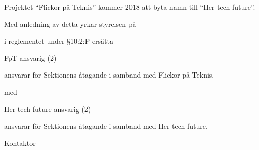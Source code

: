 \documentclass[../_main/handlingar.tex]{subfiles}
\begin{document}
Projektet ``Flickor på Teknis'' kommer 2018 att byta namn till ``Her tech future''.

Med anledning av detta yrkar styrelsen på
\begin{attsatser}
    \att i reglementet under \S10:2:P ersätta\par
        FpT-ansvarig (2)
        \begin{tightdashlist}
            \item ansvarar för Sektionens åtagande i samband med Flickor på Teknis.
        \end{tightdashlist}
        med

          Her tech future-ansvarig (2)
          \begin{tightdashlist}
              \item ansvarar för Sektionens åtagande i samband med Her tech future.
          \end{tightdashlist}
\end{attsatser}

\begin{signatures}{1}
    \ist
    \signature{Erik Månsson}{Kontaktor}
\end{signatures}
\end{document}
